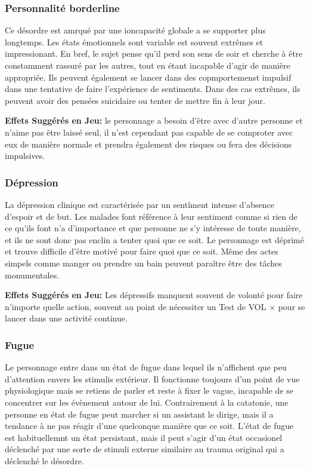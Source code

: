 \subsubsection{Personnalité borderline} 

Ce désordre est amrqué par une ioncapacité globale a se supporter plus longtemps. Les états émotionnels sont variable est souvent extrêmes et impressionant. En bref, le sujet pense qu'il perd son sens de soir et cherche à être constamment rassuré par les autres, tout en étant incapable d'agir de manière appropriée. Ils peuvent également se lancer dans des copmportemenst impulsif dans une tentative de faire l'expérience de sentiments. Dans des cas extrêmes, ils peuvent avoir des pensées suicidaire ou tenter de mettre fin à leur jour. 

\textbf{Effets Suggérés en Jeu:} le personnage a besoin d'être avec d'autre personne et n'aime pas être laissé seul, il n'est cependant pas capable de se comproter avec eux de manière normale et prendra également des risques ou fera des décisions impulsives. 

\subsubsection{Dépression} 

La dépression clinique est caractérisée par un sentîment intense d'absence d'espoir et de but. Les malades font référence à leur sentiment comme si rien de ce qu'ils font n'a d'importance et que personne ne s'y intéresse de toute manière, et ils ne sont donc pas enclin a tenter quoi que ce soit. Le personnage est déprimé et trouve difficile d'être motivé pour faire quoi que ce soit. Même des actes simpels comme manger ou prendre un bain peuvent paraître être des tâches monumentales. 

\textbf{Effets Suggérés en Jeu:} Les dépressifs manquent souvent de volonté pour faire n'importe quelle action, souvent au point de nécessiter un Test de VOL $\times$ pour se lancer dans une activité continue. 

\subsubsection{Fugue} 

Le personnage entre dans un état de fugue dans lequel ils n'affichent que peu d'attention envers les stimulis extérieur. Il fonctionne toujours d'un point de vue physiologique mais se retiens de parler et reste à fixer le vague, incapable de se concentrer sur les évènement autour de lui. Contrairement à la catatonie, une personne en état de fugue peut marcher si un assistant le dirige, mais il a tendance à ne pas réagir d'une quelconque manière que ce soit. L'état de fugue est habituellemnt un état persistant, mais il peut s'agir d'un état occasionel déclenché par une sorte de stimuli externe similaire au trauma original qui a déclenché le désordre. 

